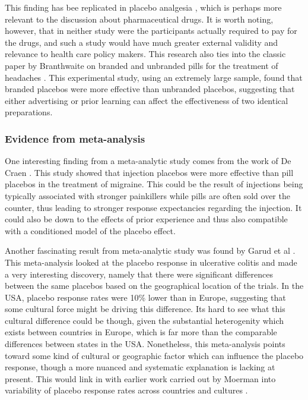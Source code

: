 This finding has bee replicated in placebo analgesia \cite{Waber2008}, which is perhaps more relevant to the discussion about pharmaceutical drugs. It is worth noting, however, that in neither study were the participants actually required to pay for the drugs, and such a study would have much greater external validity and relevance to health care policy makers. This research also ties into the classic paper by Branthwaite on branded and unbranded pills for the treatment of headaches \cite{Branthwaite1981}.  This experimental study, using an extremely large sample, found that branded placebos were more effective than unbranded placebos, suggesting that either advertising or prior learning can affect the effectiveness of two identical preparations. 



\subsubsection{Evidence from meta-analysis}
\label{sec:evidence-from-meta}
One interesting finding from a meta-analytic study comes from the work of De Craen \cite{Craen2000}. This study showed that injection placebos were more effective than pill placebos in the treatment of migraine. This could be the result of injections being typically associated with stronger painkillers while pills are often sold over the counter, thus leading to stronger response expectancies regarding the injection. It could also be down to the effects of prior experience and thus also compatible with a conditioned model of the placebo effect. 

Another fascinating result from meta-analytic study was found by Garud et al \cite{Garud2008}. This meta-analysis looked at the placebo response in ulcerative colitis and made a very interesting discovery, namely that there were significant differences between the same placebos based on the geographical location of the trials. In the USA, placebo response rates were 10\% lower than in Europe, suggesting that some cultural force might be driving this difference. Its hard to see what this cultural difference could be though, given the substantial heterogenity which exists between countries in Europe, which is far more than the comparable differences between states in the USA. Nonetheless, this meta-analysis points toward some kind of cultural or geographic factor which can influence the placebo response, though a more nuanced and systematic explanation is lacking at present. This would link in with earlier work carried out by Moerman into variability of placebo response rates across countries and cultures \cite{Moerman2000}. 

